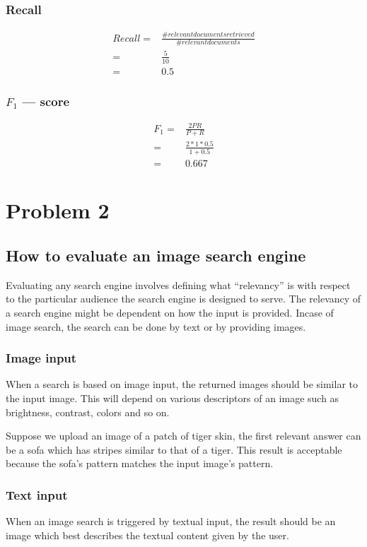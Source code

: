 \documentclass{article}
\begin{document}
\subsubsection{Recall}
\begin{align*}
  Recall =& \frac{\#relevant documents retrieved}{\#relevant documents}\\
  =& \frac{5}{10} \\
  =& 0.5
\end{align*}

\subsubsection{$F_{1}$ --- score}
\begin{align*}
  F_{1} =& \frac{2PR}{P+R} \\
  =& \frac{2 * 1 * 0.5}{1 + 0.5} \\
  =& 0.667
\end{align*}

\section{Problem 2}
\subsection{How to evaluate an image search engine}
Evaluating any search engine involves defining what ``relevancy'' is with respect to the particular audience the search engine is designed to serve.
The relevancy of a search engine might be dependent on how the input is provided.  Incase of image search, the search can be done by text or by providing images.

\subsubsection{Image input}
When a search is based on image input, the returned images should be similar to the input image.  This will depend on various descriptors of an image such as brightness, contrast, colors and so on.

Suppose we upload an image of a patch of tiger skin, the first relevant answer can be a sofa which has stripes similar to that of a tiger.  This result is acceptable because the sofa's pattern matches the input image's pattern.

\subsubsection{Text input}
When an image search is triggered by textual input, the result should be an image which best describes the textual content given by the user.
\end{document}
